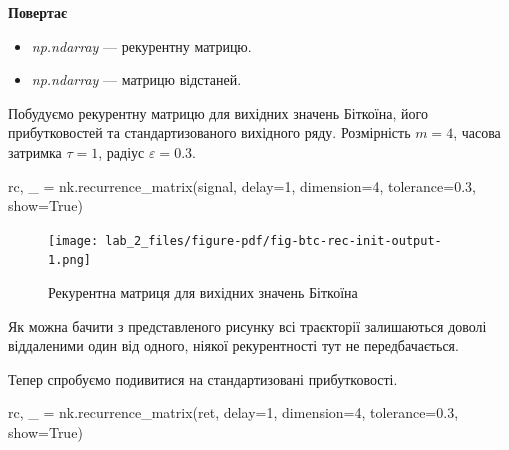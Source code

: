 \documentclass[
  letterpaper,
]{report}
\newenvironment{Shaded}{\begin{snugshade}}{\end{snugshade}}
\newcommand{\DecValTok}[1]{\textcolor[rgb]{0.68,0.00,0.00}{#1}}
\newcommand{\FloatTok}[1]{\textcolor[rgb]{0.68,0.00,0.00}{#1}}
\newcommand{\NormalTok}[1]{\textcolor[rgb]{0.00,0.23,0.31}{#1}}
\newcommand{\OperatorTok}[1]{\textcolor[rgb]{0.37,0.37,0.37}{#1}}
\newcommand{\VariableTok}[1]{\textcolor[rgb]{0.07,0.07,0.07}{#1}}
\providecommand{\tightlist}{%
  \setlength{\itemsep}{0pt}\setlength{\parskip}{0pt}}\usepackage{longtable,booktabs,array}
\begin{document}
\textbf{Повертає}

\begin{itemize}
\tightlist
\item
  \emph{np.ndarray} --- рекурентну матрицю.
\item
  \emph{np.ndarray} --- матрицю відстаней.
\end{itemize}

Побудуємо рекурентну матрицю для вихідних значень Біткоїна, його
прибутковостей та стандартизованого вихідного ряду. Розмірність \(m=4\),
часова затримка \(\tau=1\), радіус \(\varepsilon=0.3\).

\begin{Shaded}
\begin{Highlighting}[]
\NormalTok{rc, \_ }\OperatorTok{=}\NormalTok{ nk.recurrence\_matrix(signal, }
\NormalTok{                            delay}\OperatorTok{=}\DecValTok{1}\NormalTok{, }
\NormalTok{                            dimension}\OperatorTok{=}\DecValTok{4}\NormalTok{, }
\NormalTok{                            tolerance}\OperatorTok{=}\FloatTok{0.3}\NormalTok{,}
\NormalTok{                            show}\OperatorTok{=}\VariableTok{True}\NormalTok{)}
\end{Highlighting}
\end{Shaded}

\begin{figure}[H]

{\centering \texttt{[image: lab\_2\_files/figure-pdf/fig-btc-rec-init-output-1.png]}

}

\caption{\label{fig-btc-rec-init}Рекурентна матриця для вихідних значень
Біткоїна}

\end{figure}

Як можна бачити з представленого рисунку всі траєкторії залишаються
доволі віддаленими один від одного, ніякої рекурентності тут не
передбачається.

Тепер спробуємо подивитися на стандартизовані прибутковості.

\begin{Shaded}
\begin{Highlighting}[]
\NormalTok{rc, \_ }\OperatorTok{=}\NormalTok{ nk.recurrence\_matrix(ret, }
\NormalTok{                            delay}\OperatorTok{=}\DecValTok{1}\NormalTok{, }
\NormalTok{                            dimension}\OperatorTok{=}\DecValTok{4}\NormalTok{,}
\NormalTok{                            tolerance}\OperatorTok{=}\FloatTok{0.3}\NormalTok{,}
\NormalTok{                            show}\OperatorTok{=}\VariableTok{True}\NormalTok{)}
\end{Highlighting}
\end{Shaded}
\end{document}
